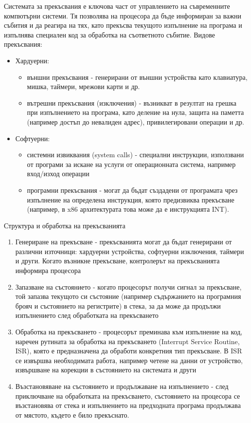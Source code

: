 \documentclass{article}
\begin{document}
Системата за прекъсвания е ключова част от управлението на съвременните компютърни системи. Тя позволява на процесора да бъде информиран за важни
събития и да реагира на тях, като прекъсва текущото изпълнение на програма и изпълнява специален код за обработка на съответното събитие. \newline\newline
Видове прекъсвания:
\begin{itemize}
    \item Хардуерни:
    \begin{itemize}
        \item външни прекъсвания - генерирани от външни устройства като клавиатура, мишка, таймери, мрежови карти и др.
        \item вътрешни прекъсвания (изключения) - възникват в резултат на грешка при изпълнението на програма, като деление
        на нула, защита на паметта (например достъп до невалиден адрес), привилегировани операции и др.
    \end{itemize}
    \item Софтуерни:
    \begin{itemize}
        \item системни извиквания (system calls) - специални инструкции, използвани от програми за искане на услуги от операционната
        система, например вход/изход операции
        \item програмни прекъсвания - могат да бъдат създадени от програмата чрез изпълнение на определена инструкция, която предизвиква
        прекъсване (например, в x86 архитектурата това може да е инструкцията INT).
    \end{itemize}
\end{itemize}
Структура и обработка на прекъсванията
\begin{enumerate}
    \item Генериране на прекъсване - прекъсванията могат да бъдат генерирани от различни източници: хардуерни устройства, софтуерни изключения,
    таймери и други. Когато възникне прекъсване, контролерът на прекъсванията информира процесора
    \item Запазване на състоянието - когато процесорът получи сигнал за прекъсване, той запазва текущото си състояние (например съдържанието на
    програмния брояч и състоянието на регистрите) в стека, за да може да продължи изпълнението след обработката на прекъсването
    \item Обработка на прекъсването - процесорът преминава към изпълнение на код, наречен рутината за обработка на прекъсването (Interrupt Service
    Routine, ISR), която е предназначена да обработи конкретния тип прекъсване. В ISR се извършва необходимата работа, например четене на данни от
    устройство, извършване на корекции в състоянието на системата и други
    \item Възстановяване на състоянието и продължаване на изпълнението - след приключване на обработката на прекъсването, състоянието на процесора
    се възстановява от стека и изпълнението на предходната програма продължава от мястото, където е било прекъснато.
\end{enumerate}
\end{document}
